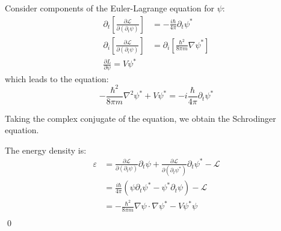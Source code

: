 \documentclass[12pt]{article}
\begin{document}


Consider components of the Euler-Lagrange equation for $\psi$:
\begin{equation}
    \begin{split}
        \partial_{t} \left[ \frac{\partial \mathcal{L}}{\partial (\partial_{t} \psi)} \right] &= -\frac{i\hbar}{4\pi} \partial_{t} \psi^{*} \\
        \partial_{i} \left[ \frac{\partial \mathcal{L}}{\partial (\partial_{i} \psi)} \right] &= \partial_{i} \left[ \frac{\hbar^{2}}{8\pi m} \nabla \psi^{*} \right] \\
        \frac{\partial L}{\partial \psi} = V \psi^{*}
    \end{split}
\end{equation}
which leads to the equation:
\begin{equation}
    -\frac{\hbar^{2}}{8\pi m} \nabla^{2} \psi^{*} + V \psi^{*} = -i\frac{\hbar}{4\pi} \partial_{t} \psi^{*}
\end{equation}

Taking the complex conjugate of the equation, we obtain the Schrodinger equation.

The energy density is:
\begin{equation}
    \begin{split}
        \varepsilon &= \frac{\partial \mathcal{L}}{\partial (\partial_{t} \psi)} \partial_{t} \psi + \frac{\partial \mathcal{L}}{\partial (\partial_{t} \psi^{*})} \partial_{t} \psi^{*} - \mathcal{L} \\
        &= \frac{i\hbar}{4\pi} (\psi \partial_{t} \psi^{*} - \psi^{*} \partial_{t} \psi) - \mathcal{L} \\
        &= -\frac{\hbar^{2}}{8\pi m} \nabla \psi \cdot \nabla \psi^{*} - V \psi^{*} \psi \\
    \end{split}
\end{equation}
\qed
\end{document}
